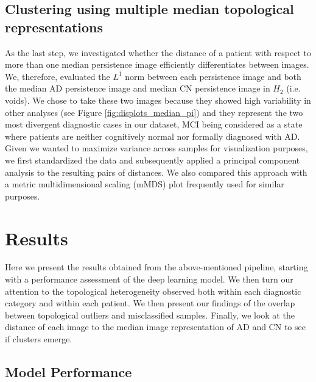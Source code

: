 \documentclass{article}
\begin{document}
\subsection{Clustering using multiple median topological representations}\label{sec:methods_dist_multiple_images}

As the last step, we investigated whether the distance of a patient with respect to more than one
median persistence image efficiently differentiates between images. We, therefore, evaluated the
$L^1$ norm between each persistence image and both the median AD persistence image and median CN
persistence image in $H_2$ (i.e. voids). We chose to take these two images because they showed high
variability in other analyses (see Figure \ref{fig:displots_median_pi}) and they represent the two
most divergent diagnostic cases in our dataset, MCI being considered as a state where patients are
neither cognitively normal nor formally diagnosed with AD. Given we wanted to maximize variance
across samples for visualization purposes, we first standardized the data and subsequently applied a
principal component analysis to the resulting pairs of distances. We also compared this approach
with a metric multidimensional scaling (mMDS) plot frequently used for similar purposes.

\section{Results}\label{sec:results}

Here we present the results obtained from the above-mentioned pipeline, starting with a performance
assessment of the deep learning model. We then turn our attention to the topological heterogeneity
observed both within each diagnostic category and within each patient. We then present our findings
of the overlap between topological outliers and misclassified samples. Finally, we look at the
distance of each image to the median image representation of AD and CN to see if clusters
emerge.

\subsection{Model Performance}
\end{document}
